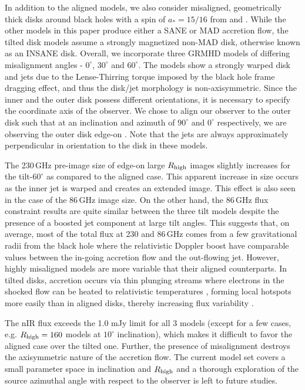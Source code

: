 In addition to the aligned models, we also consider misaligned, geometrically thick disks around black holes with a spin of $a_*=15/16$ from \citet{Liska2018} and \citet{Chatterjee2020}. While the other models in this paper produce either a SANE or MAD accretion flow, the tilted disk models assume a strongly magnetized non-MAD disk, otherwise known as an INSANE disk. Overall, we incorporate three GRMHD models of differing misalignment angles - $0^{\circ}$, $30^{\circ}$ and $60^{\circ}$. The models show a strongly warped disk and jets due to the Lense-Thirring torque imposed by the black hole frame dragging effect, and thus the disk/jet morphology is non-axisymmetric. Since the inner and the outer disk possess different orientations, it is necessary to specify the coordinate axis of the observer. We chose to align our observer to the outer disk such that at an inclination and azimuth of $90^{\circ}$ and $0^{\circ}$ respectively, we are observing the outer disk edge-on \citep[for more details, see][]{Chatterjee2020}. Note that the jets are always approximately perpendicular in orientation to the disk in these models.

The 230\,GHz pre-image size of edge-on large $R_{\rm high}$ images slightly increases for the tilt-$60^{\circ}$ as compared to the aligned case. This apparent increase in size occurs as the inner jet is warped and creates an extended image. This effect is also seen in the case of the 86\,GHz image size. On the other hand, the 86\,GHz flux constraint results are quite similar between the three tilt models despite the presence of a boosted jet component at large tilt angles. This suggests that, on average, most of the total flux at 230 and 86\,GHz comes from a few gravitational radii from the black hole where the relativistic Doppler boost have comparable values between the in-going accretion flow and the out-flowing jet. However, highly misaligned models are more variable that their aligned counterparts. In tilted disks, accretion occurs via thin plunging streams \citep[e.g.,][]{Fragile2007} where electrons in the shocked flow can be heated to relativistic temperatures \citep[e.g.][]{Dexter2013}, forming local hotspots more easily than in aligned disks, thereby increasing flux variability \citep{Chatterjee2020}.

The nIR flux exceeds the 1.0 mJy limit for all 3 models (except for a few cases, e.g. $R_{\rm high}=160$ models at $10^{\circ}$ inclination), which makes it difficult to favor the aligned case over the tilted one. Further, the presence of misalignment destroys the axisymmetric nature of the accretion flow. The current model set covers a small parameter space in inclination and $R_{\rm high}$ and a thorough exploration of the source azimuthal angle with respect to the observer is left to future studies.

